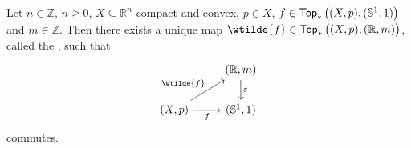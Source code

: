 \begin{proposition}
	\label{prop:lifting_circle}
	Let $n \in \mathbb{Z}$, $n \geq 0$, $X \subseteq \mathbb{R}^n$ compact and convex, $p \in X$, $f \in \mathsf{Top}_\ast\del[1]{(X,p),(\mathbb{S}^1,1)}$ and $m \in \mathbb{Z}$. Then there exists a unique map $\wtilde{f} \in \mathsf{Top}_\ast\del[1]{(X,p),(\mathbb{R},m)}$, called the , such that 
	\begin{equation*}
		\begin{tikzcd}
			& (\mathbb{R},m) \arrow[d,"\varepsilon"]\\
			(X,p) \ar[r,"f"']\arrow[ur,"\wtilde{f}"] & (\mathbb{S}^1,1)
		\end{tikzcd}
	\end{equation*}
	\noindent commutes. 
\end{proposition}

